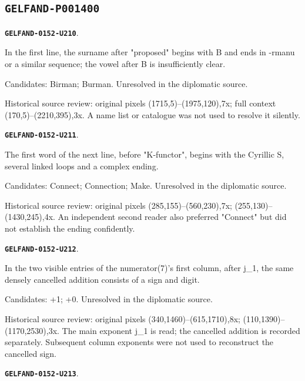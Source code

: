 \documentclass[11pt]{article}
\theoremstyle{definition}
\theoremstyle{remark}
\begin{document}
\subsection*{\texttt{GELFAND-P001400}}
\par\noindent\leavevmode{}\label{GELFAND-0152-U210}\label{GELFAND-P001400:heading-recipient:note}\textbf{\texttt{GELFAND-0152-U210}}.\nopagebreak[4]\par
In the first line, the surname after "proposed" begins with B and ends in -rmanu or a similar sequence; the vowel after B is insufficiently clear.\par
Candidates: Birman; Burman. Unresolved in the diplomatic source.\par
Historical source review: original pixels (1715,5)–(1975,120),7x; full context (170,5)–(2210,395),3x. A name list or catalogue was not used to resolve it silently.\par\medskip
\par\noindent\leavevmode{}\label{GELFAND-0152-U211}\label{GELFAND-P001400:heading-verb:note}\textbf{\texttt{GELFAND-0152-U211}}.\nopagebreak[4]\par
The first word of the next line, before "K-functor", begins with the Cyrillic S, several linked loops and a complex ending.\par
Candidates: Connect; Connection; Make. Unresolved in the diplomatic source.\par
Historical source review: original pixels (285,155)–(560,230),7x; (255,130)–(1430,245),4x. An independent second reader also preferred "Connect" but did not establish the ending confidently.\par\medskip
\par\noindent\leavevmode{}\label{GELFAND-0152-U212}\label{GELFAND-P001400:numerator-first-column-cancellations:note}\textbf{\texttt{GELFAND-0152-U212}}.\nopagebreak[4]\par
In the two visible entries of the numerator(7)'s first column, after j\_1, the same densely cancelled addition consists of a sign and digit.\par
Candidates: +1; +0. Unresolved in the diplomatic source.\par
Historical source review: original pixels (340,1460)–(615,1710),8x; (110,1390)–(1170,2530),3x. The main exponent j\_1 is read; the cancelled addition is recorded separately. Subsequent column exponents were not used to reconstruct the cancelled sign.\par\medskip
\par\noindent\leavevmode{}\label{GELFAND-0152-U213}\label{GELFAND-P001400:right-of-numerator:note}\textbf{\texttt{GELFAND-0152-U213}}.\nopagebreak[4]\par
\end{document}
